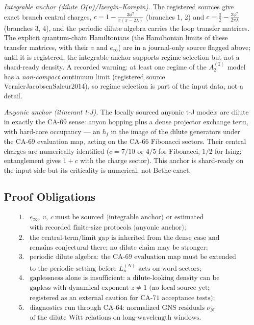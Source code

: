 \emph{Integrable anchor (dilute O(n)/Izergin--Korepin).}  The registered
sources give exact branch central charges,
\(c=1-\frac{3\phi^2}{\pi(\pi-2\lambda)}\) (branches 1, 2) and
\(c=\frac32-\frac{3\phi^2}{2\pi\lambda}\) (branches 3, 4), and the periodic
dilute algebra carries the loop transfer matrices.  The explicit quantum-chain
Hamiltonians (the Hamiltonian limits of these transfer matrices, with their
\(v\) and \(e_\infty\)) are in a journal-only source flagged above; until it
is registered, the integrable anchor supports regime selection but not a
shard-ready density.  A recorded warning: at least one regime of the
\(A_2^{(2)}\) model has a \emph{non-compact} continuum limit (registered
source VernierJacobsenSaleur2014), so regime selection is part of the input
data, not a detail.

\emph{Anyonic anchor (itinerant t-J).}  The locally sourced anyonic t-J
models are dilute in exactly the CA-69 sense: anyon hopping plus a dense
projector exchange term, with hard-core occupancy --- an \(h_j\) in the image
of the dilute generators under the CA-69 evaluation map, acting on the CA-66
Fibonacci sectors.  Their central charges are numerically identified
(\(c=7/10\) or \(4/5\) for Fibonacci, \(1/2\) for Ising; entanglement gives
\(1+c\) with the charge sector).  This anchor is shard-ready on the input
side but its criticality is numerical, not Bethe-exact.

\subsection{Proof Obligations}

\[
\begin{array}{ll}
1.&e_\infty,\ v,\ c\ \text{must be sourced (integrable anchor) or estimated}\\
  &\text{with recorded finite-size protocols (anyonic anchor);}\\
2.&\text{the central-term/limit gap is inherited from the dense case and}\\
  &\text{remains conjectural there; no dilute claim may be stronger;}\\
3.&\text{periodic dilute algebra: the CA-69 evaluation map must be extended}\\
  &\text{to the periodic setting before } L_n^{(N)}\text{ acts on word sectors;}\\
4.&\text{gaplessness alone is insufficient: a dilute-looking density can be}\\
  &\text{gapless with dynamical exponent } z\neq1\text{ (no local source yet;}\\
  &\text{registered as an external caution for CA-71 acceptance tests);}\\
5.&\text{diagnostics run through CA-64: normalized GNS residuals } \nu_N\\
  &\text{of the dilute Witt relations on long-wavelength windows.}
\end{array}
\]

